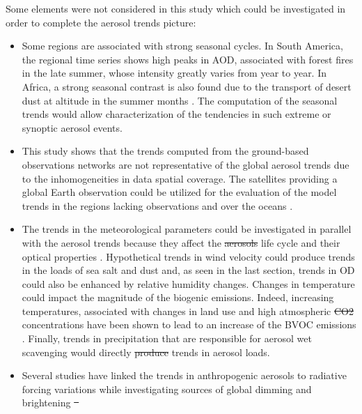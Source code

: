 \documentclass[acp, manuscript]{copernicus}
\providecommand{\DIFadd}[1]{{\protect\color{blue}\uwave{#1}}} %
\providecommand{\DIFdel}[1]{{\protect\color{red}\sout{#1}}}                      %
\providecommand{\DIFaddbegin}{} %
\providecommand{\DIFaddend}{} %
\providecommand{\DIFdelbegin}{} %
\providecommand{\DIFdelend}{} %
\begin{document}
Some elements were not considered in this study which could be investigated in order to complete the aerosol trends picture:
\begin{itemize}
 \item Some regions are associated with strong seasonal cycles. In South America, the regional time series shows high peaks in AOD, associated with forest fires in the late summer, whose intensity greatly varies from year to year. In Africa, a strong seasonal contrast is also found due to the transport of desert dust at altitude in the summer months \citep{mortier2016, ogunjobi2008synoptic}. The computation of the seasonal trends would allow characterization of the tendencies in such extreme or synoptic aerosol events.
 \item  This study shows that the trends computed from the ground-based observations networks are not representative of the global aerosol trends due to the inhomogeneities in data spatial coverage. The satellites providing a global Earth observation could be utilized for the evaluation of the model trends in the regions lacking observations and over the oceans \citep{hsu2012global,zhang2010decadal}.
 \item The trends in the meteorological parameters could be investigated in parallel with the aerosol trends because they affect the \DIFdelbegin \DIFdel{aerosols }\DIFdelend \DIFaddbegin \DIFadd{aerosol }\DIFaddend life cycle and their optical properties \citep{che2019large}. Hypothetical trends in wind velocity could produce trends in the loads of sea salt and dust and, as seen in the last section, trends in OD could also be enhanced by relative humidity changes. Changes in temperature could impact the magnitude of the biogenic emissions. Indeed, increasing temperatures, associated with changes in land use and high atmospheric \DIFdelbegin \DIFdel{CO2 }\DIFdelend \DIFaddbegin {} \DIFaddend concentrations have been shown to lead to an increase of the BVOC emissions \citep{penuelas2010bvocs}. Finally, trends in precipitation that are responsible for aerosol wet scavenging would directly \DIFdelbegin \DIFdel{produce }\DIFdelend \DIFaddbegin \DIFadd{impact }\DIFaddend trends in aerosol loads.
 \item Several studies have linked the trends in anthropogenic aerosols to radiative forcing variations while investigating sources of global dimming and brightening \DIFdelbegin \DIFdel{\mbox{%
\cite{streets2006two,norris2007trends}}\hspace{0pt}%
}\DIFdelend \DIFaddbegin \DIFadd{\mbox{%
}}
\end{itemize}
\end{document}
